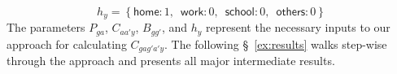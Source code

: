 \begin{equation}
  h_y = \left\{
  \textsf{home}:   1,\enspace
  \textsf{work}:   0,\enspace
  \textsf{school}: 0,\enspace
  \textsf{others}: 0 \right\}
\end{equation}
The parameters $P_{ga}$, $C_{aa'y}$, $B_{gg'}$, and $h_y$ represent
the necessary inputs to our approach for calculating $C_{gag'a'y}$.
The following \S~\ref{ex:results} walks step-wise through the approach
and presents all major intermediate results.
\clearpage %
